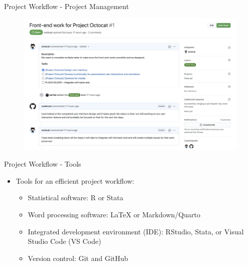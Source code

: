 \documentclass{beamer}
\begin{document}
\begin{frame}{Project Workflow - Project Management}
    \begin{figure}
        \includegraphics[scale=0.45]{manage.png}
    \end{figure}    
\end{frame}

\begin{frame}{Project Workflow - Tools}
    \begin{itemize}
        \item Tools for an efficient project workflow:
        \smallskip
            \begin{itemize}
                \item Statistical software: R or Stata
                \item Word processing software: LaTeX or Markdown/Quarto
                \item Integrated development environment (IDE): RStudio, Stata, or Visual Studio Code (VS Code)
                \item Version control: Git and GitHub
            \end{itemize}
        \end{itemize}
\end{frame}
\end{document}
